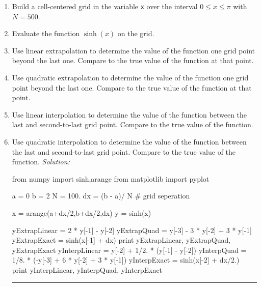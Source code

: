 \begin{enumerate}
\prob 
\begin{enumerate}
\item Build a cell-centered grid in the variable {\tt x} over the
interval $0 \le x \le \pi$ with $N=500$.
\item Evaluate the function $\sinh(x)$ on the grid.
\item Use linear extrapolation to determine the value of the function
  one grid point beyond the last one.  Compare to the true value of the
  function at that point.
\item Use quadratic extrapolation to determine the value of the function
  one grid point beyond the last one.  Compare to the true value of
  the function at that point.
\item Use linear interpolation to determine the value of the function
  between the last and second-to-last grid point.  Compare to the true
  value of the function.
\item Use quadratic interpolation to determine the value of the
  function between the last and second-to-last grid point.  Compare to
  the true value of the function.
\ifsolutions
\textit{Solution:}\\
\begin{codeexample}
\begin{VerbatimOut}{\listingFile}
from numpy import sinh,arange
from matplotlib import pyplot

a = 0
b = 2
N = 100.
dx = (b  - a)/ N  # grid seperation

x = arange(a+dx/2,b+dx/2,dx)
y = sinh(x)

yExtrapLinear = 2 * y[-1] - y[-2]
yExtrapQuad = y[-3] - 3 * y[-2] + 3 * y[-1]
yExtrapExact = sinh(x[-1] + dx)
print yExtrapLinear, yExtrapQuad, yExtrapExact
yInterpLinear =  y[-2] + 1/2. * (y[-1] - y[-2])
yInterpQuad = 1/8. * (-y[-3] + 6 * y[-2] + 3 * y[-1])
yInterpExact = sinh(x[-2] + dx/2.)
print yInterpLinear, yInterpQuad, yInterpExact
\end{VerbatimOut}
\end{codeexample}
\else
\noindent\rule{4 in}{0.01 in}
\fi
\end{enumerate}
\end{enumerate}
